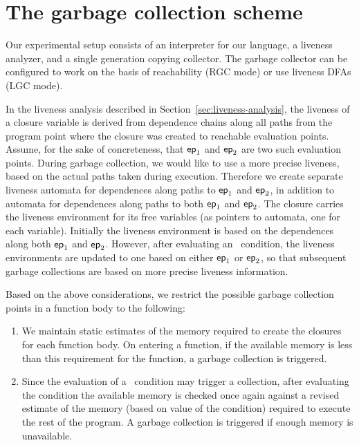 \documentclass[preprint, 9pt]{sigplanconf}
\begin{document}
\section{The garbage collection scheme}
\label{sec:GC-scheme}

Our experimental setup  consists of an interpreter
for  our  language,  a liveness  analyzer,  and  a
single generation copying  collector.  The garbage
collector can be configured to work on the
basis  of  reachability  (RGC  mode)  or  use  
liveness  DFAs  (LGC  mode).  

In        the       liveness        analysis       described        in
Section~\ref{sec:liveness-analysis},   the  liveness   of  a   closure
variable is  derived from dependence  chains along all paths  from the
program point  where the closure  was created to  reachable evaluation
points.  Assume,  for the  sake of  concreteness, that  $\mathsf{ep}_1$ and
$\mathsf{ep}_2$ are two such evaluation points.  During garbage collection,
we would like to use a more precise liveness, based on the actual paths
taken  during  execution.   Therefore   we  create  separate  liveness
automata for dependences  along paths to $\mathsf{ep}_1$  and $\mathsf{ep}_2$, in
addition to  automata for dependences  along paths to  both $\mathsf{ep}_1$
and $\mathsf{ep}_2$.  The closure carries  the liveness environment for its
free  variables (as  pointers  to automata,  one  for each  variable).
Initially the liveness  environment is based on  the dependences along
both  $\mathsf{ep}_1$   and  $\mathsf{ep}_2$.   However,  after   evaluating  an
\SIF\ condition, the liveness environments are updated to one based on
either   $\mathsf{ep}_1$  or   $\mathsf{ep}_2$,  so   that  subsequent   garbage
collections are based on more precise liveness information.

Based on  the above considerations,  we restrict the  possible garbage
collection points in a function body to the following:
\begin{enumerate}
\item We  maintain static estimates  of the memory required  to create
  the closures for each function body.  On entering a function, if the
  available memory is  less than this requirement for  the function, a
  garbage collection is triggered.
\item Since the evaluation of a  \SIF\ condition may trigger a 
  collection, after evaluating the condition   the available memory
  is  checked once  again against  a  revised estimate  of the  memory
  (based on  value of the condition)  required to execute the  rest of
  the program.  A garbage collection is triggered if enough memory is unavailable.
\end{enumerate}
\end{document}
